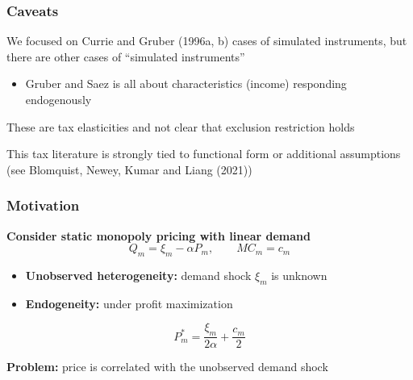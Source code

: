 \documentclass[notes,11pt, aspectratio=169]{beamer}
\newenvironment{wideitemize}{\itemize\addtolength{\itemsep}{10pt}}{\enditemize}
\begin{document}
\begin{frame}
\frametitle{Caveats}

\begin{wideitemize}
\item   We focused on Currie and Gruber (1996a, b) cases of simulated instruments, but there are other cases of ``simulated instruments'' 
\begin{itemize}
\item Gruber and Saez is all about characteristics (income) responding endogenously
\end{itemize}
\item These are tax elasticities and not clear that exclusion restriction holds
\item This tax literature is strongly tied to functional form or additional assumptions (see Blomquist, Newey, Kumar and Liang (2021))
\end{wideitemize}
\end{frame}


\begin{frame}

\frametitle{Motivation}

\textbf{Consider static monopoly pricing with linear demand}
\[
Q_m = \xi_m - \alpha P_m,
\qquad
MC_m = c_m
\]

\begin{itemize}
    \item \textbf{Unobserved heterogeneity:} demand shock $\xi_m$ is unknown
    \item \textbf{Endogeneity:} under profit maximization
\end{itemize}

\[
P_m^* = \frac{\xi_m}{2\alpha} + \frac{c_m}{2}
\]


\vspace{0.2cm}

\textbf{Problem:} price is correlated with the unobserved demand shock

\end{frame}
\end{document}
